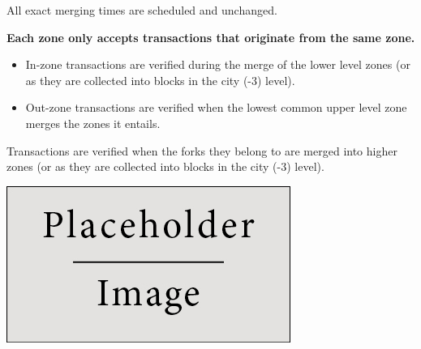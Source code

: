 \documentclass[portrait,ansidpaper,fontscale=0.445]{baposter} %
\begin{document}
\begin{poster}
{\begin{multicols}{2}
All exact merging times are scheduled and unchanged.

\textbf{Each zone only accepts transactions that originate from the same zone.}
\begin{itemize}[leftmargin=1em]
    \item In-zone transactions are verified during the merge of the
        lower level zones (or as they are collected into blocks in the
        city (-3) level).
    \item Out-zone transactions are verified when the lowest common
        upper level zone merges the zones it entails.
\end{itemize}

Transactions are verified when the forks they belong to are merged into higher
zones (or as they are collected into blocks in the city (-3) level).

\begin{center}
\includegraphics[width=0.8\linewidth]{placeholder}
\end{center}

\end{multicols}
}


\end{poster}
\end{document}
